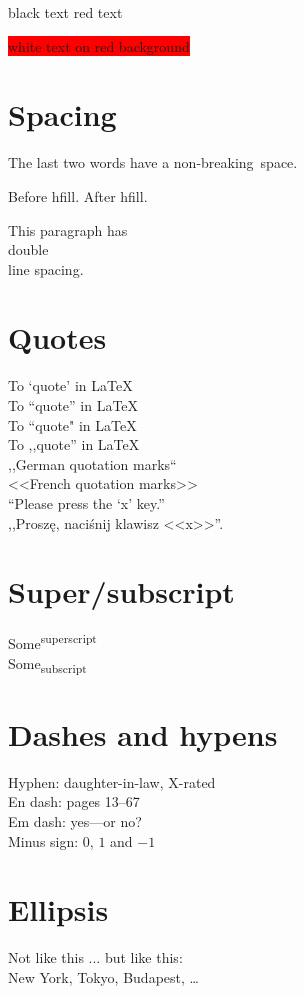 \documentclass{article}
\begin{document}
  {black text \color{red}red text}

  \colorbox{red}{\color{white}white text on red background}

  \section{Spacing}

  The last two words have a non-breaking~space.

  Before hfill. \hfill After hfill.

  \begin{doublespace}
    This paragraph has \\ double \\ line spacing.
  \end{doublespace}

  \section{Quotes}

  To `quote' in LaTeX \\
  To ``quote'' in LaTeX \\
  To ``quote" in LaTeX \\
  To ,,quote'' in LaTeX \\
  ,,German quotation marks`` \\
  <<French quotation marks>> \\
  ``Please press the `x' key.'' \\
  ,,Proszę, naciśnij klawisz <<x>>''.

  \section{Super/subscript}

  Some\textsuperscript{superscript} \\
  Some\textsubscript{subscript}

  \section{Dashes and hypens}

  Hyphen: daughter-in-law, X-rated\\
  En dash: pages 13--67\\
  Em dash: yes---or no? \\
  Minus sign: $0$, $1$ and $-1$

  \section{Ellipsis}

  Not like this ... but like this:\\
  New York, Tokyo, Budapest, \ldots
\end{document}
